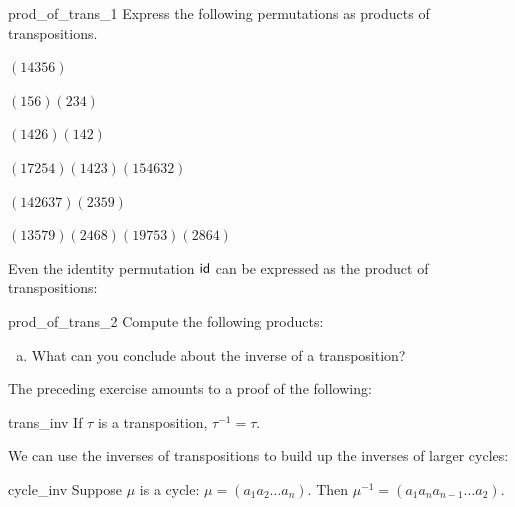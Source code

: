 \begin{exercise}{prod_of_trans_1}
Express the following permutations as products of transpositions. 

\begin{enumerate}[(a)]
\begin{multicols}{2}
 \item
$( 1 4 3 5 6 )$
\item
$( 1 5 6 )( 2 3 4 )$
 \item
$( 1 4 2 6 )( 1 4 2 )$
 \item
$( 1 7 2 5 4 )( 1 4 2 3 )( 1 5 4 6 3 2 )$
 \item
$( 1 4 2 6 3 7 )(2 3 5 9)$
\item
$( 1 3 5 7 9 )(2 4 6 8 ) (1 9 7 5 3) (2 8 6 4)$
\end{multicols}
\end{enumerate}

\end{exercise}

\noindent
Even the identity permutation ${\sf{i}d}$ can be expressed as the product of transpositions:

\begin{exercise}{prod_of_trans_2}
Compute the following products:
\begin{enumerate}[(a)]
\item
What can you conclude about the inverse of a transposition?
\end{enumerate}
\end{exercise}

\noindent
The preceding exercise amounts to a proof of the following:

\begin{prop}{trans_inv}
If $\tau$ is a transposition, $\tau^{-1} = \tau$.
\end{prop}

We can use the inverses of transpositions to build up the inverses of larger cycles:

\begin{prop}{cycle_inv}
Suppose $\mu$ is a cycle: $\mu = (a_1 a_2 \ldots  a_n)$. Then $\mu^{-1} = (a_1 a_n a_{n-1}  \ldots a_2 )$.
\end{prop}

